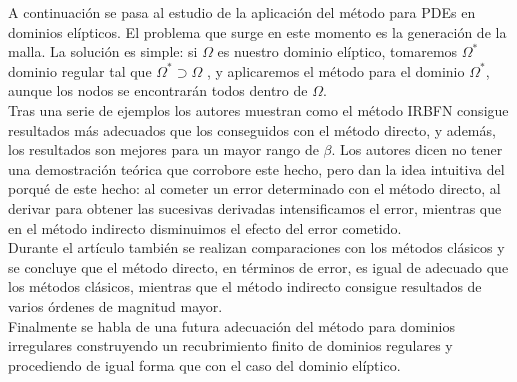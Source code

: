 \documentclass[12pt]{article}       %
\begin{document}
A continuación se pasa al estudio de la aplicación del método para PDEs en dominios elípticos. El problema que surge en este momento es la generación de la malla. La solución es simple: si $\Omega$ es nuestro dominio elíptico, tomaremos $\Omega^*$ dominio regular tal que $\Omega^*\supset \Omega$ , y aplicaremos el método para el dominio $\Omega^*$, aunque los nodos se encontrarán todos dentro de $\Omega$.\\

Tras una serie de ejemplos los autores muestran como el método IRBFN consigue resultados más adecuados que los conseguidos con el método directo, y además, los resultados son mejores para un mayor rango de $\beta$. Los autores dicen no tener una demostración teórica que corrobore este hecho, pero dan la idea intuitiva del porqué de este hecho: al cometer un error determinado con el método directo, al derivar para obtener las sucesivas derivadas intensificamos el error, mientras que en el método indirecto disminuimos el efecto del error cometido.\\%

Durante el artículo también se realizan comparaciones con los métodos clásicos y se concluye que el método directo, en términos de error, es igual de adecuado que los métodos clásicos, mientras que el método indirecto consigue resultados de varios órdenes de magnitud mayor.\\

Finalmente se habla de una futura adecuación del método para dominios irregulares construyendo un recubrimiento finito de dominios regulares y procediendo de igual forma que con el caso del dominio elíptico.\\
\end{document}
